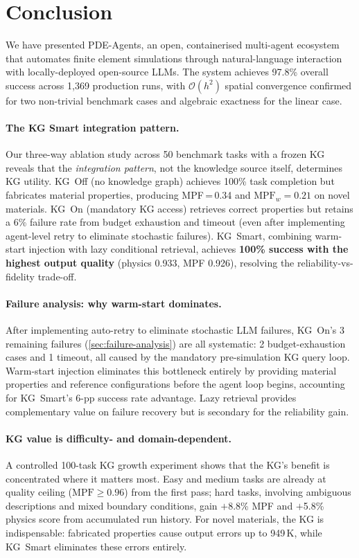 \documentclass[twocolumn]{article}
\begin{document}
\section{Conclusion}
\label{sec:conclusion}

We have presented PDE-Agents, an open, containerised multi-agent ecosystem
that automates finite element simulations through natural-language interaction
with locally-deployed open-source LLMs.  The system achieves 97.8\% overall
success across 1{,}369 production runs, with $\mathcal{O}(h^2)$
spatial convergence confirmed for two non-trivial benchmark cases
and algebraic exactness for the linear case.

\paragraph{The KG Smart integration pattern.}
Our three-way ablation study across 50 benchmark tasks with a frozen KG
reveals that the \emph{integration pattern}, not the knowledge source
itself, determines KG utility.  KG~Off (no knowledge graph) achieves
100\% task completion but fabricates material properties, producing
MPF\,=\,0.34 and $\text{MPF}_w{=}0.21$ on novel materials.
KG~On (mandatory KG access) retrieves correct properties but retains
a 6\% failure rate from budget exhaustion and timeout (even after
implementing agent-level retry to eliminate stochastic failures).
KG~Smart, combining warm-start injection with lazy conditional
retrieval, achieves \textbf{100\% success with the highest output
quality} (physics 0.933, MPF 0.926), resolving the
reliability-vs-fidelity trade-off.

\paragraph{Failure analysis: why warm-start dominates.}
After implementing auto-retry to eliminate stochastic LLM failures,
KG~On's 3 remaining failures (\cref{sec:failure-analysis}) are all
systematic: 2 budget-exhaustion cases and 1 timeout, all caused by
the mandatory pre-simulation KG query loop.  Warm-start injection
eliminates this bottleneck entirely by providing material properties
and reference configurations before the agent loop begins,
accounting for KG~Smart's 6-pp success rate advantage.  Lazy retrieval
provides complementary value on failure recovery but is secondary
for the reliability gain.

\paragraph{KG value is difficulty- and domain-dependent.}
A controlled 100-task KG growth experiment shows that the KG's benefit
is concentrated where it matters most.  Easy and medium tasks are already
at quality ceiling ($\text{MPF}{\geq}0.96$) from the first pass; hard
tasks, involving ambiguous descriptions and mixed boundary conditions, gain
$+$8.8\% MPF and $+$5.8\% physics score from accumulated run history.
For novel materials, the KG is indispensable: fabricated properties cause
output errors up to 949\,K, while KG~Smart eliminates these errors entirely.
\end{document}

